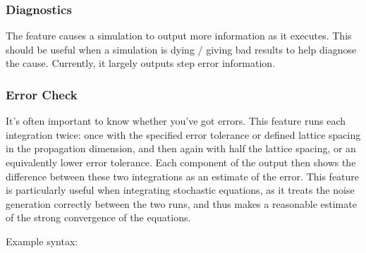 \documentclass[letterpaper,10pt,english]{sphinxmanual}
\begin{document}
\begin{sphinxVerbatim}[commandchars=\\\{\}]
 
          
\end{sphinxVerbatim}

\ignorespaces 

\subsubsection{Diagnostics}
\label{\detokenize{reference_elements:diagnostics}}\label{\detokenize{reference_elements:index-14}}\label{\detokenize{reference_elements:id3}}
\sphinxAtStartPar
The  feature causes a simulation to output more information as it executes.  This should be useful when a simulation is dying / giving bad results to help diagnose the cause.  Currently, it largely outputs step error information.

\ignorespaces 

\subsubsection{Error Check}
\label{\detokenize{reference_elements:error-check}}\label{\detokenize{reference_elements:errorcheck}}\label{\detokenize{reference_elements:index-15}}
\sphinxAtStartPar
It’s often important to know whether you’ve got errors.  This feature runs each integration twice: once with the specified error tolerance or defined lattice spacing in the propagation dimension, and then again with half the lattice spacing, or an equivalently lower error tolerance.  Each component of the output then shows the difference between these two integrations as an estimate of the error.  This feature is particularly useful when integrating stochastic equations, as it treats the noise generation correctly between the two runs, and thus makes a reasonable estimate of the strong convergence of the equations.

\sphinxAtStartPar
Example syntax:
\end{document}
